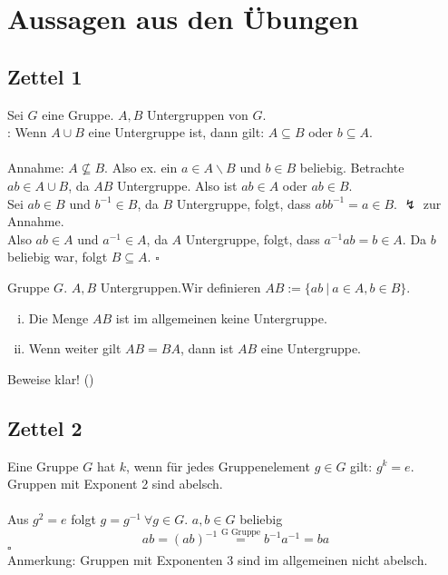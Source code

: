 \section*{Aussagen aus den Übungen}
\label{sec:übungenalg}

\subsection*{Zettel 1}
\label{sub:zettel_1alg}
Sei $G$ eine Gruppe. $A,B$ Untergruppen von $G$.\\
\zz: Wenn $A\cup B$ eine Untergruppe ist, dann gilt: $A\subseteq B$ oder $b\subseteq A$.\\

\\
Annahme: $A\not\subseteq B$. Also ex. ein $a\in A\backslash B$ und $b\in B$ beliebig. Betrachte $ab\in A\cup B$, da $AB$ Untergruppe. Also ist $ab\in A$ oder $ab\in B$.\\
Sei $ab\in B$ und $b^{-1}\in B$, da $B$ Untergruppe, folgt, dass $abb^{-1}=a\in B$. $\lightning$ zur Annahme.\\
Also $ab\in A$ und $a^{-1}\in A$, da $A$ Untergruppe, folgt, dass $a^{-1}ab=b\in A$. Da $b$ beliebig war, folgt $B\subseteq A$.
\hfill $\square$

Gruppe $G$. $A,B$ Untergruppen.Wir definieren $AB:=\{ab~|~a\in A,b \in B \}$.\\
\begin{enumerate}[(i)]
	\item Die Menge $AB$ ist im allgemeinen keine Untergruppe.
	\item Wenn weiter gilt $AB=BA$, dann ist $AB$ eine Untergruppe.
\end{enumerate}
Beweise klar! (\checkmark)

\subsection*{Zettel 2}
\label{sub:zettel_2lga}
Eine Gruppe $G$ hat  $k$, wenn für jedes Gruppenelement $g\in G$ gilt: $g^k=e$.\\
\zz Gruppen mit Exponent 2 sind abelsch.\\

\\
Aus $g^2=e$ folgt $g=g^{-1}~\forall g\in G$. $a,b\in G$ beliebig\\
\[ ab=(ab)^{-1}\stackrel{\text{G Gruppe}}{=} b^{-1}a^{-1}=ba \]
\hfill $\square$\\
Anmerkung: Gruppen mit Exponenten 3 sind im allgemeinen nicht abelsch.

